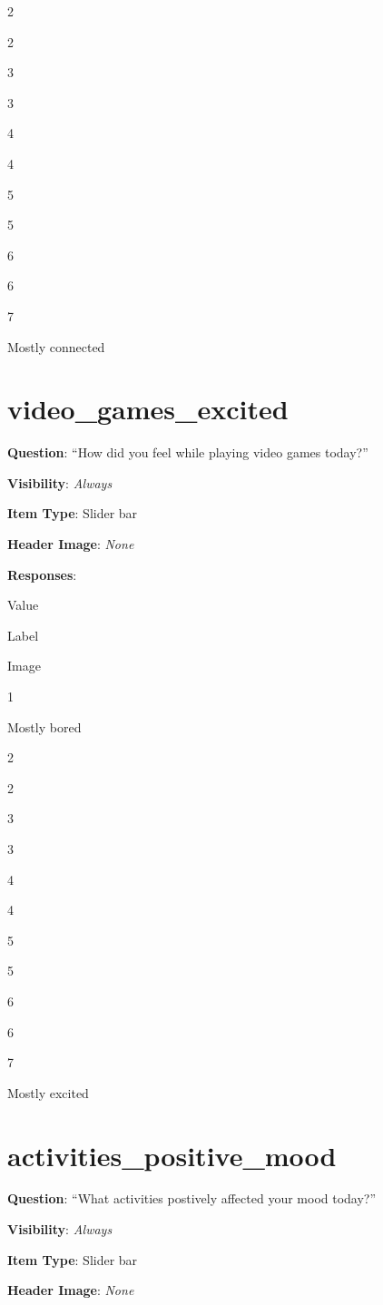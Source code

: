 \documentclass[]{book}
\begin{document}
2

2

3

3

4

4

5

5

6

6

7

Mostly connected

\hypertarget{video_games_excited}{%
\section{video\_games\_excited}\label{video_games_excited}}

\textbf{Question}: ``How did you feel while playing video games today?''

\textbf{Visibility}: \emph{Always}

\textbf{Item Type}: Slider bar

\textbf{Header Image}: \emph{None}

\textbf{Responses}:

Value

Label

Image

1

Mostly bored

2

2

3

3

4

4

5

5

6

6

7

Mostly excited

\hypertarget{activities_positive_mood}{%
\section{activities\_positive\_mood}\label{activities_positive_mood}}

\textbf{Question}: ``What activities postively affected your mood today?''

\textbf{Visibility}: \emph{Always}

\textbf{Item Type}: Slider bar

\textbf{Header Image}: \emph{None}
\end{document}
